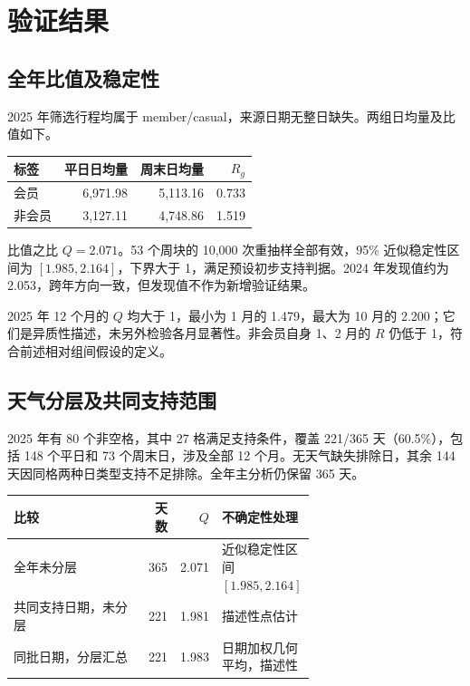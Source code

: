 \documentclass[UTF8,fontset=fandol,a4paper,zihao=-4]{ctexart}
\begin{document}
\section{验证结果}

\subsection{全年比值及稳定性}

2025 年筛选行程均属于 member/casual，来源日期无整日缺失。两组日均量及比值如下。

\begin{center}
\begin{tabular}{lrrr}
\toprule
标签 & 平日日均量 & 周末日均量 & $R_g$\\
\midrule
会员 & 6,971.98 & 5,113.16 & 0.733\\
非会员 & 3,127.11 & 4,748.86 & 1.519\\
\bottomrule
\end{tabular}
\end{center}

比值之比 $Q=2.071$。53 个周块的 10,000 次重抽样全部有效，95\% 近似稳定性区间为 $[1.985,2.164]$，下界大于 1，满足预设初步支持判据。2024 年发现值约为 2.053，跨年方向一致，但发现值不作为新增验证结果。

2025 年 12 个月的 $Q$ 均大于 1，最小为 1 月的 1.479，最大为 10 月的 2.200；它们是异质性描述，未另外检验各月显著性。非会员自身 1、2 月的 $R$ 仍低于 1，符合前述相对组间假设的定义。

\subsection{天气分层及共同支持范围}

2025 年有 80 个非空格，其中 27 格满足支持条件，覆盖 221/365 天（60.5\%），包括 148 个平日和 73 个周末日，涉及全部 12 个月。无天气缺失排除日，其余 144 天因同格两种日类型支持不足排除。全年主分析仍保留 365 天。

\begin{center}
\small
\begin{tabular}{p{0.43\linewidth}rr>{\raggedright\arraybackslash}p{0.23\linewidth}}
\toprule
比较 & 天数 & $Q$ & 不确定性处理\\
\midrule
全年未分层 & 365 & 2.071 & 近似稳定性区间 $[1.985,2.164]$\\
共同支持日期，未分层 & 221 & 1.981 & 描述性点估计\\
同批日期，分层汇总 & 221 & 1.983 & 日期加权几何平均，描述性\\
\bottomrule
\end{tabular}
\end{center}
\end{document}
